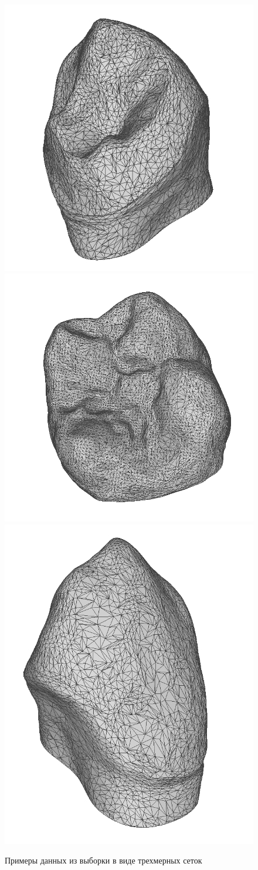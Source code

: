\begin{figure}[ht!]
    \includegraphics[width=.3\textwidth]{images/snapshot207.png}\hfill
    \includegraphics[width=.3\textwidth]{images/snapshot208.png}\hfill
    \includegraphics[width=.3\textwidth]{images/snapshot400.png}
    \label{fig:ex3}
    \caption{Примеры данных из выборки в виде трехмерных сеток}
\end{figure}


